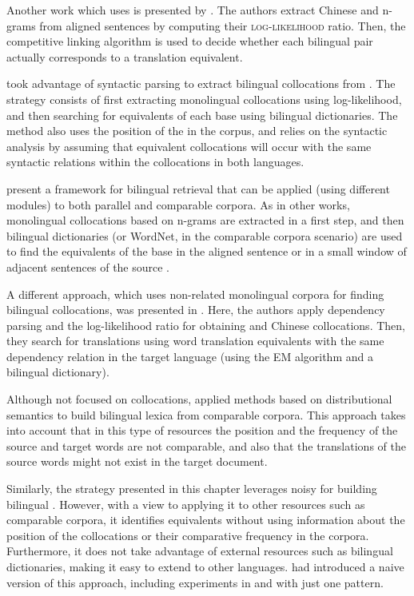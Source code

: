 \documentclass[output=paper,modfonts,nonflat]{langsci/langscibook}
\begin{document}
Another work which uses  is presented by \citet{wu2003}. The authors
extract Chinese and  n-grams from aligned sentences by computing their \textsc{log-likelihood} ratio.
Then, the competitive linking algorithm is used to decide whether each bilingual pair actually
corresponds to a translation equivalent.

\citet{seretan2007} took advantage of syntactic parsing to extract bilingual collocations from .
The strategy consists of first extracting monolingual collocations using log-likelihood,
and then searching for equivalents of each base using bilingual dictionaries.
The method also uses the position of the  in the corpus, and relies on the syntactic analysis
by assuming that equivalent collocations will occur with the same syntactic relations within the collocations in both languages.

\citet{Rivera2013} present a framework for bilingual  retrieval
that can be applied (using different modules) to both parallel and comparable corpora.
As in other works, monolingual collocations based on n-grams are extracted in a first
step, and then bilingual dictionaries (or WordNet, in the comparable corpora scenario) are used
to find the equivalents of the base in the aligned sentence or in a small window of
adjacent sentences of the source .

\largerpage
A different approach, which uses non-related monolingual corpora for finding bilingual
collocations, was presented in \citet{lu2004}. Here, the authors apply dependency parsing
and the log-likelihood ratio for obtaining  and Chinese collocations. Then,
they search for translations using word translation equivalents with the same dependency
relation in the target language (using the EM algorithm and a bilingual dictionary).

Although not focused on collocations, \citet{fung1998} applied methods based on distributional
semantics to build bilingual lexica from comparable corpora.
This approach takes into account that in this type of resources the position and the frequency
of the source and target words are not comparable, and also that the translations of the source
words might not exist in the target document.

Similarly, the strategy presented in this chapter leverages noisy  for building
bilingual . However, with a view to applying it to other resources such as comparable corpora, it identifies equivalents without using information about the position of the collocations
or their comparative frequency in the corpora. Furthermore, it does not take advantage
of external resources such as bilingual dictionaries, making it easy to extend to other languages.
\citet{pacorbook} had introduced a naive version of this approach, including experiments in  and  with just one  pattern.
\end{document}
